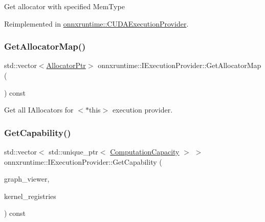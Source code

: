 Get allocator with specified Mem\+Type 

Reimplemented in \mbox{\hyperlink{classonnxruntime_1_1CUDAExecutionProvider_a01469a525b621ce14a85fcc8187847c4}{onnxruntime\+::\+C\+U\+D\+A\+Execution\+Provider}}.

\mbox{\label{classonnxruntime_1_1IExecutionProvider_a25d94e7e7bd716f636a7f64802376751}} 
\subsubsection{\texorpdfstring{Get\+Allocator\+Map()}{GetAllocatorMap()}}
{\footnotesize\ttfamily std\+::vector$<$\mbox{\hyperlink{namespaceonnxruntime_a6cdac724c5dcefded3a63f08dae58fda}{Allocator\+Ptr}}$>$ onnxruntime\+::\+I\+Execution\+Provider\+::\+Get\+Allocator\+Map (\begin{DoxyParamCaption}{ }\end{DoxyParamCaption}) const\hspace{0.3cm}{\ttfamily [inline]}}

Get all I\+Allocators for $<$$\ast$this$>$ execution provider. \mbox{\label{classonnxruntime_1_1IExecutionProvider_a6f17ba64b2355b26293a4cfc3fac376f}} 
\subsubsection{\texorpdfstring{Get\+Capability()}{GetCapability()}}
{\footnotesize\ttfamily std\+::vector$<$ std\+::unique\+\_\+ptr$<$ \mbox{\hyperlink{structonnxruntime_1_1ComputationCapacity}{Computation\+Capacity}} $>$ $>$ onnxruntime\+::\+I\+Execution\+Provider\+::\+Get\+Capability (\begin{DoxyParamCaption}\item[{const \mbox{\hyperlink{classonnxruntime_1_1GraphViewer}{onnxruntime\+::\+Graph\+Viewer}} \&}]{graph\+\_\+viewer,  }\item[{const std\+::vector$<$ const \mbox{\hyperlink{classonnxruntime_1_1KernelRegistry}{Kernel\+Registry}} $\ast$$>$ \&}]{kernel\+\_\+registries }\end{DoxyParamCaption}) const\hspace{0.3cm}{\ttfamily [virtual]}}

